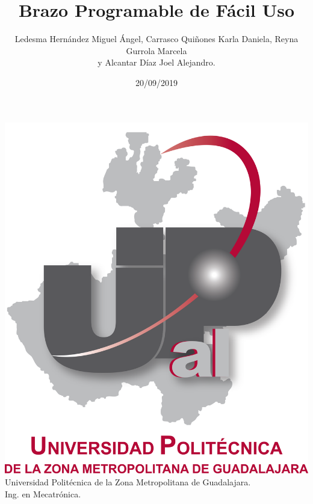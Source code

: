 \documentclass[letterpaper]{article}
\title{\textbf{Brazo Programable de Fácil Uso }}
\author{Ledesma Hernández Miguel Ángel, Carrasco Quiñones Karla Daniela, Reyna Gurrola Marcela\\ y Alcantar Díaz Joel Alejandro.}
\date{20/09/2019}
\begin{document}
\maketitle
\begin{center}
    \includegraphics[scale=0.5]{Img/UPZMGlog.png}\\
    \vspace{1cm}
    Universidad Politécnica de la Zona Metropolitana de Guadalajara.\\
    \vspace{1cm}
Ing. en Mecatrónica.
\end{center}\newpage
\end{document}

